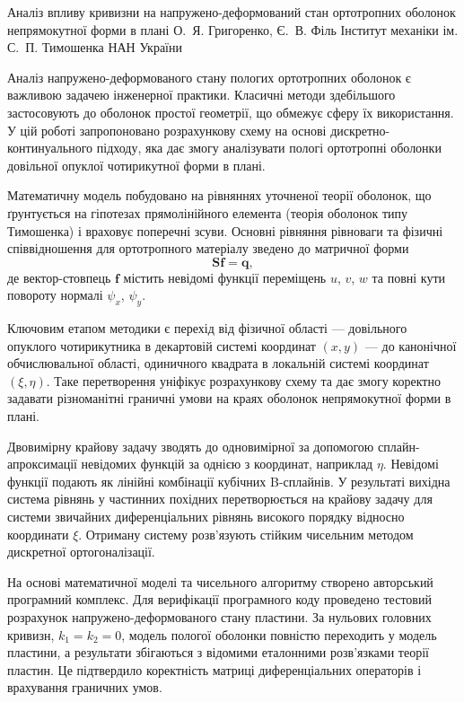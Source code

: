 \ReportHeading
  {Аналіз впливу кривизни на напружено-деформований стан ортотропних оболонок непрямокутної форми в плані}
  {О.~Я. Григоренко, Є.~В. Філь}
  {Інститут механіки ім. С.~П. Тимошенка НАН України}
  {}

Аналіз напружено-деформованого стану пологих ортотропних оболонок є важливою задачею інженерної практики. Класичні методи здебільшого застосовують до оболонок простої геометрії, що обмежує сферу їх використання. У цій роботі запропоновано розрахункову схему на основі дискретно-континуального підходу, яка дає змогу аналізувати пологі ортотропні оболонки довільної опуклої чотирикутної форми в плані.

Математичну модель побудовано на рівняннях уточненої теорії оболонок, що ґрунтується на гіпотезах прямолінійного елемента (теорія оболонок типу Тимошенка) і враховує поперечні зсуви. Основні рівняння рівноваги та фізичні співвідношення для ортотропного матеріалу зведено до матричної форми
\begin{equation}
  \mathbf{S}\boldsymbol{f}=\boldsymbol{q},
\end{equation}
де вектор-стовпець $\boldsymbol{f}$ містить невідомі функції переміщень $u$, $v$, $w$ та повні кути повороту нормалі $\psi_x$, $\psi_y$.

Ключовим етапом методики є перехід від фізичної області --- довільного опуклого чотирикутника в декартовій системі координат $(x,y)$ --- до канонічної обчислювальної області, одиничного квадрата в локальній системі координат $(\xi,\eta)$. Таке перетворення уніфікує розрахункову схему та дає змогу коректно задавати різноманітні граничні умови на краях оболонок непрямокутної форми в плані.

Двовимірну крайову задачу зводять до одновимірної за допомогою сплайн-апроксимації невідомих функцій за однією з координат, наприклад $\eta$. Невідомі функції подають як лінійні комбінації кубічних B-сплайнів. У результаті вихідна система рівнянь у частинних похідних перетворюється на крайову задачу для системи звичайних диференціальних рівнянь високого порядку відносно координати $\xi$. Отриману систему розв’язують стійким чисельним методом дискретної ортогоналізації.

На основі математичної моделі та чисельного алгоритму створено авторський програмний комплекс. Для верифікації програмного коду проведено тестовий розрахунок напружено-деформованого стану пластини. За нульових головних кривизн, $k_1=k_2=0$, модель пологої оболонки повністю переходить у модель пластини, а результати збігаються з відомими еталонними розв’язками теорії пластин. Це підтвердило коректність матриці диференціальних операторів і врахування граничних умов.

